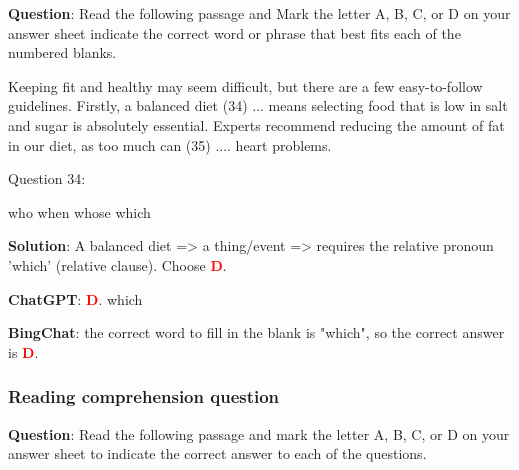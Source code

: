 \documentclass{article}
\begin{document}
{	\begin{mdframed}[linewidth=1pt,linecolor=red] \textbf{Question}: Read the following passage and Mark the letter A, B, C, or D on your answer sheet indicate the correct word or phrase that best fits each of the numbered blanks.
		
		Keeping fit and healthy may seem difficult, but there are a few easy-to-follow guidelines. Firstly, a balanced diet (34) ... means selecting food that is low in salt and sugar is absolutely essential. Experts recommend reducing the amount of fat in our diet, as too much can (35) .... heart problems. 
		
		Question 34: 
		
		\begin{oneparchoices}
			\choice who
			\choice when
			\choice whose		
			\choice  which
		\end{oneparchoices}
		
		\textbf{Solution}: A balanced diet => a thing/event => requires the relative pronoun 'which' (relative clause). Choose \textcolor{red}{\textbf{D}}. 
		
		\textbf{ChatGPT}: \textcolor{red}{\textbf{D}}. which
		
		\textbf{BingChat}: the correct word to fill in the blank is "which", so the correct answer is \textcolor{red}{\textbf{D}}.
		
	\end{mdframed}
	
	\subsubsection{Reading comprehension question}
	\label{VNHSGE_Eng_RC}
	\begin{mdframed}[linewidth=1pt,linecolor=red] \textbf{Question}: 
		Read the following passage and mark the letter A, B, C, or D on your answer sheet to indicate the correct answer to each of the questions.
		

\end{mdframed}}
\end{document}
